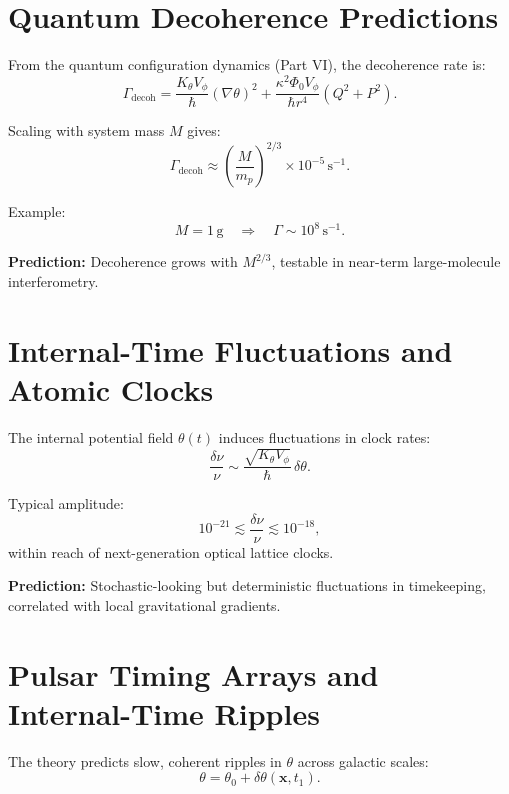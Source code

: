 \documentclass[12pt]{article}
\begin{document}

\newpage
\section{Quantum Decoherence Predictions}

From the quantum configuration dynamics (Part VI), the decoherence rate is:
\begin{equation}
\Gamma_{\text{decoh}}
=
\frac{K_\theta V_\phi}{\hbar} (\nabla \theta)^2
+
\frac{\kappa^2 \Phi_0 V_\phi}{\hbar r^4}(Q^2 + P^2).
\end{equation}

Scaling with system mass \(M\) gives:
\[
\Gamma_{\text{decoh}}
\approx
\left(\frac{M}{m_p}\right)^{2/3}
\times 10^{-5}\,\mathrm{s}^{-1}.
\]

Example:
\[
M = 1\,\mathrm{g}
\quad \Rightarrow \quad
\Gamma \sim 10^8\,\mathrm{s}^{-1}.
\]

\textbf{Prediction:}  
Decoherence grows with \(M^{2/3}\), testable in near-term large-molecule
interferometry.


\newpage
\section{Internal-Time Fluctuations and Atomic Clocks}

The internal potential field \(\theta(t)\) induces fluctuations in clock rates:
\[
\frac{\delta\nu}{\nu}
\sim
\frac{\sqrt{K_\theta V_\phi}}{\hbar}\,\delta\theta.
\]

Typical amplitude:
\[
10^{-21}
\lesssim
\frac{\delta\nu}{\nu}
\lesssim
10^{-18},
\]
within reach of next-generation optical lattice clocks.

\textbf{Prediction:}  
Stochastic-looking but deterministic fluctuations in timekeeping, correlated
with local gravitational gradients.


\newpage
\section{Pulsar Timing Arrays and Internal-Time Ripples}

The theory predicts slow, coherent ripples in \(\theta\) across galactic scales:
\[
\theta = \theta_0 + \delta\theta(\mathbf{x},t_1).
\]
\end{document}
